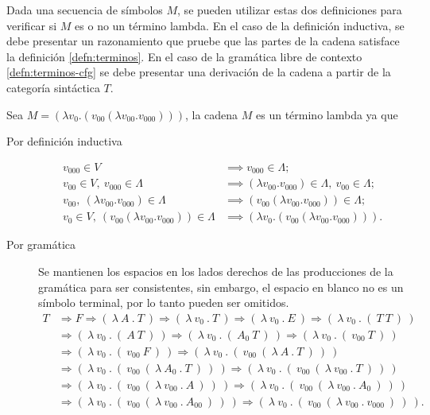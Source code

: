 Dada una secuencia de símbolos \( M \), se pueden utilizar estas dos definiciones para verificar si \( M \) es o no un término lambda. En el caso de la definición inductiva, se debe presentar un razonamiento que pruebe que las partes de la cadena satisface la definición \ref{defn:terminos}. En el caso de la gramática libre de contexto \ref{defn:terminos-cfg} se debe presentar una derivación de la cadena a partir de la categoría sintáctica \( T \).

\begin{exmp} Sea \( M = (λv_{0}.(v_{00} (λv_{00}.v_{000}))) \), la cadena \( M \) es un término lambda ya que

  \begin{description}
  \item[Por definición inductiva]
    \begin{align*}
      v_{000} \in V &\implies v_{000} \in Λ; \\
      v_{00} \in V,\ v_{000} \in Λ &\implies (λv_{00}.v_{000}) \in Λ,\ v_{00} \in Λ; \\
      v_{00},\ (λv_{00}.v_{000}) \in Λ &\implies (v_{00} (λv_{00}.v_{000})) \in Λ; \\
      v_{0} \in V,\ (v_{00} (λv_{00}.v_{000})) \in Λ &\implies (λv_{0}.(v_{00} (λv_{00}.v_{000}))).
    \end{align*}
  \item[Por gramática] Se mantienen los espacios en los lados derechos de las producciones de la gramática para ser consistentes, sin embargo, el espacio en blanco no es un símbolo terminal, por lo tanto pueden ser omitidos.
    \begin{align*}
      T &\Rightarrow F \Rightarrow (\ λ\ A\ .\ T\ ) \Rightarrow (\ λ\ v_{0}\ .\ T\ ) \Rightarrow (\ λ\ v_{0}\ .\ E\ ) \Rightarrow (\ λ\ v_{0}\ .\ (\ T\ T\ )\ ) \\
        &\Rightarrow (\ λ\ v_{0}\ .\ (\ A\ T\ )\ ) \Rightarrow (\ λ\ v_{0}\ .\ (\ A_{0}\ T\ )\ ) \Rightarrow (\ λ\ v_{0}\ .\ (\ v_{00}\ T\ )\ ) \\
        &\Rightarrow (\ λ\ v_{0}\ .\ (\ v_{00}\ F\ )\ ) \Rightarrow (\ λ\ v_{0}\ .\ (\ v_{00}\ (\ λ\ A\ .\ T\ )\ )\ ) \\
        &\Rightarrow (\ λ\ v_{0}\ .\ (\ v_{00}\ (\ λ\ A_{0}\ .\ T\ )\ )\ ) \Rightarrow (\ λ\ v_{0}\ .\ (\ v_{00}\ (\ λ\ v_{00}\ .\ T\ )\ )\ ) \\
        &\Rightarrow (\ λ\ v_{0}\ .\ (\ v_{00}\ (\ λ\ v_{00}\ .\ A\ )\ )\ ) \Rightarrow (\ λ\ v_{0}\ .\ (\ v_{00}\ (\ λ\ v_{00}\ .\ A_{0}\ )\ )\ ) \\
        &\Rightarrow (\ λ\ v_{0}\ .\ (\ v_{00}\ (\ λ\ v_{00}\ .\ A_{00}\ )\ )\ ) \Rightarrow (\ λ\ v_{0}\ .\ (\ v_{00}\ (\ λ\ v_{00}\ .\ v_{000}\ )\ )\ ).
    \end{align*}
  \end{description}
\end{exmp}

